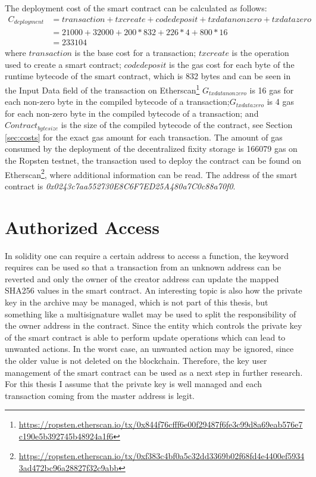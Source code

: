 The deployment cost of the smart contract can be calculated as follows:
\begin{equation}\label{eq:create-cost}
  \begin{split}
      C_{deployment} & = transaction + txcreate + codedeposit + txdatanonzero + txdatazero \\
      & = 21000 + 32000 + 200 * 832 + 226 * 4 + 800 * 16 \\
      & = 233104
  \end{split}
\end{equation}
where $transaction$ is the base cost for a transaction; $txcreate$ is the operation used to create a smart contract; $codedeposit$ is the gas cost for each byte of the runtime bytecode of the smart contract, which is 832 bytes and can be seen in the Input Data field of the transaction on Etherscan\footnote{\url{https://ropsten.etherscan.io/tx/0x844f76cfff6e00f29487f6fe3c99d8a69eab576e7c190e5b392745b48924a1f6}}
\textit{$G_{txdatanonzero}$} is 16 gas for each non-zero byte in the compiled bytecode of a transaction;\textit{$G_{txdatazero}$} is 4 gas for each non-zero byte in the compiled bytecode of a transaction; and \textit{$Contract_{bytesize}$} is the size of the compiled bytecode of the contract, see Section \ref{sec:costs} for the exact gas amount for each transaction.
The amount of gas consumed by the deployment of the decentralized fixity storage is 166079 gas on the Ropsten testnet, the transaction used to deploy the contract can be found on Etherscan\footnote{\url{https://ropsten.etherscan.io/tx/0xf383c4bf0a5c32dd3369b02f68fd4e4400ef59343ad472bc96a28827f32c9abb}}, where additional information can be read. The address of the smart contract is \textit{0x0243c7aa552730E8C6F7ED25A480a7C0c88a70f0}.
\section{Authorized Access}
In solidity one can require a certain address to access a function, the keyword requires can be used  so that a transaction from an unknown address can be reverted and only the owner of the creator address can update the mapped SHA256 values in the smart contract. An interesting topic is also how the private key in the archive may be managed, which is not part of this thesis, but something like a multisignature wallet may be used to split the responsibility of the owner address in the contract. Since the entity which controls the private key of the smart contract is able to perform update operations which can lead to unwanted actions. In the worst case, an unwanted action may be ignored, since the older value is not deleted on the blockchain. Therefore, the key user management of the smart contract can be used as a next step in further research. For this thesis I assume that the private key is well managed and each transaction coming from the master address is legit.
